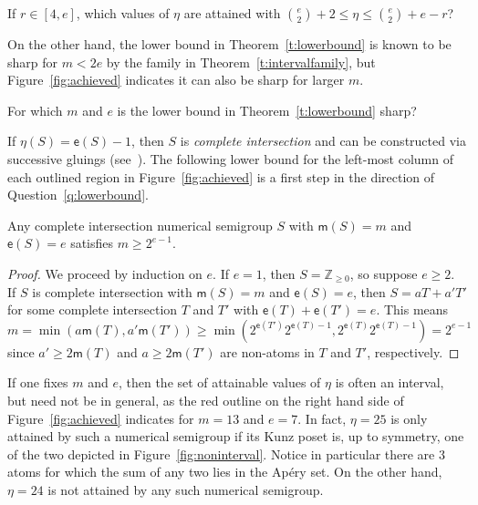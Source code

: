 \documentclass[ALCO]{cedram}
\newcommand\ZZ{\mathbb{Z}}
\begin{document}
\begin{question}\label{q:smallcodimupper}
If $r \in [4, e]$, which values of $\eta$ are attained with $\binom{e}{2} + 2 \le \eta \le \binom{e}{2} + e - r$?  
\end{question}

On the other hand, the lower bound in Theorem~\ref{t:lowerbound} is known to be sharp for $m < 2e$ by the family in Theorem~\ref{t:intervalfamily}, but Figure~\ref{fig:achieved} indicates it can also be sharp for larger $m$.  

\begin{question}\label{q:lowerbound}
For which $m$ and $e$ is the lower bound in Theorem~\ref{t:lowerbound} sharp?  
\end{question}

If $\eta(S) = \mathsf e(S) - 1$, then $S$ is \emph{complete intersection} and can be constructed via successive gluings (see~\cite{completeintersection}).  The following lower bound for the left-most column of each outlined region in Figure~\ref{fig:achieved} is a first step in the direction of Question~\ref{q:lowerbound}.  

\begin{prop}\label{p:completeintersection}
Any complete intersection numerical semigroup $S$ with $\mathsf m(S) = m$ and $\mathsf e(S) = e$ satisfies $m \ge 2^{e-1}$.  
\end{prop}

\begin{proof}
We proceed by induction on $e$.  If $e = 1$, then $S = \ZZ_{\ge 0}$, so suppose $e \ge 2$.  
If $S$ is complete intersection with $\mathsf m(S) = m$ and $\mathsf e(S) = e$, then $S = aT + a'T'$ for some complete intersection $T$ and $T'$ with $\mathsf e(T) + \mathsf e(T') = e$.  This means
$$m = \min(a \mathsf m(T), a' \mathsf m(T')) \ge \min(2^{\mathsf e(T')} 2^{\mathsf e(T)-1}, 2^{\mathsf e(T)} 2^{\mathsf e(T)-1}) = 2^{e-1}$$
since $a' \ge 2\mathsf m(T)$ and $a \ge 2\mathsf m(T')$ are non-atoms in $T$ and $T'$, respectively.  
\end{proof}

If one fixes $m$ and $e$, then the set of attainable values of $\eta$ is often an interval, but need not be in general, as the red outline on the right hand side of Figure~\ref{fig:achieved} indicates for $m = 13$ and $e = 7$.  In fact, $\eta = 25$ is only attained by such a numerical semigroup if its Kunz poset is, up to symmetry, one of the two depicted in Figure~\ref{fig:noninterval}.  Notice in particular there are 3 atoms for which the sum of any two lies in the Ap\'ery set.  On the other hand, $\eta = 24$ is not attained by any such numerical semigroup.  
\end{document}
